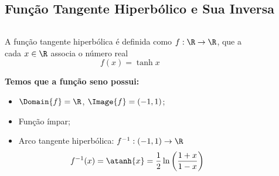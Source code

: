 \subsection{Função Tangente Hiperbólico e Sua Inversa}
\begin{frame}
  \begin{columns}[onlytextwidth]
    \begin{column}{0.49\textwidth}\vspace{-0.5cm}
      \begin{definition}
        A função tangente hiperbólica é definida como $f:\R\rightarrow\R$, que a cada $x\in\R$ associa o número real
        \begin{equation*}
          f(x) = \tanh{x}
        \end{equation*}
      \end{definition}
      \begin{highlight}
        \textbf{Temos que a função seno possui:}
        \begin{itemize}
          \item $\Domain{f} = \R$, $\Image{f} = (-1,1)$;
          \item Função ímpar;
          \item<2> Arco tangente hiperbólica: $f^{-1}:(-1,1)\rightarrow\R$\small
          \begin{equation*}
            f^{-1}(x)=\atanh{x} = \frac{1}{2}\ln{\left(\frac{1+x}{1-x}\right)}
          \end{equation*}
        \end{itemize}
      \end{highlight}
    \end{column}
    \begin{column}{0.49\textwidth}\vspace*{-0.5cm}
      \begin{figure}
      \end{figure}
    \end{column}
  \end{columns}
\end{frame}
